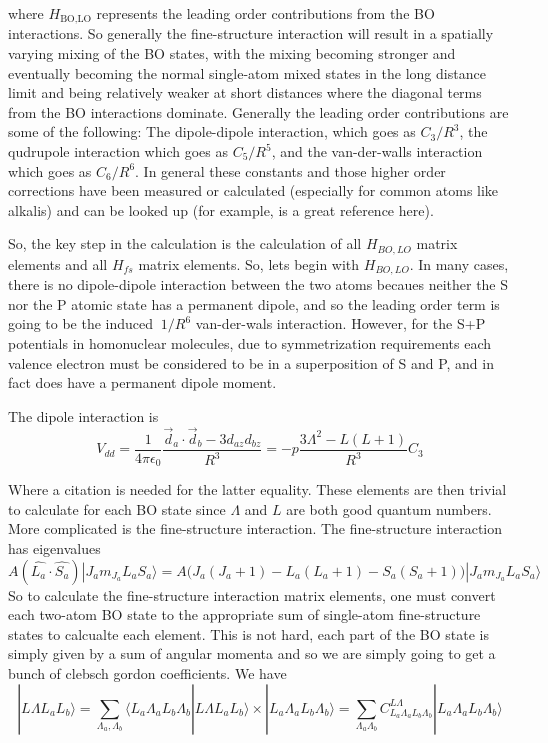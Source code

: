 \documentclass[prl, longbibliography]{revtex4-2}
\begin{document}
where $H_{\text{BO,LO}}$ represents the leading order contributions from the BO interactions. 
So generally the fine-structure interaction will result in a spatially varying mixing of the BO states, with the mixing becoming stronger and eventually becoming the normal single-atom mixed states in the long distance limit and being relatively weaker at short distances where the diagonal terms from the BO interactions dominate.
Generally the leading order contributions are some of the following: The dipole-dipole interaction, which goes as $C_3/R^3$, the qudrupole interaction which goes as $C_5/R^5$, and the van-der-walls interaction which goes as $C_6/R^6$. 
In general these constants and those higher order corrections have been measured or calculated (especially for common atoms like alkalis) and can be looked up (for example, \cite{marinescu_dispersion_1995} is a great reference here).

So, the key step in the calculation is the calculation of all $H_{BO,LO}$ matrix elements and all $H_{fs}$ matrix elements. So, lets begin with $H_{BO,LO}$. In many cases, there is no dipole-dipole interaction between the two atoms becaues neither the S nor the P atomic state has a permanent dipole, and so the leading order term is going to be the induced $~1/R^6$ van-der-wals interaction. However, for the S+P potentials in homonuclear molecules, due to symmetrization requirements each valence electron must be considered to be in a superposition of S and P, and in fact does have a permanent dipole moment. 

The dipole interaction is
\begin{equation}
V_{dd} = \frac{1}{4\pi\epsilon_0}\frac{\vec{d}_a\cdot\vec{d}_b - 3d_{az}d_{bz}}{R^3}=-p\frac{3\Lambda^2-L(L+1)}{R^3} C_3
\end{equation}

Where a citation is needed for the latter equality. These elements are then trivial to calculate for each BO state since $\Lambda$ and $L$ are both good quantum numbers. More complicated is the fine-structure interaction. The fine-structure interaction has eigenvalues
\begin{equation}
A(\hat{L_a}\cdot\hat{S_a})|J_a m_{J_a} L_a S_a\rangle = A\Big(J_a(J_a+1)-L_a(L_a+1)-S_a(S_a+1)\Big)|J_a m_{J_a} L_a S_a\rangle
\end{equation}
So to calculate the fine-structure interaction matrix elements, one must convert each two-atom BO state to the appropriate sum of single-atom fine-structure states to calcualte each element. This is not hard, each part of the BO state is simply given by a sum of angular momenta and so we are simply going to get a bunch of clebsch gordon coefficients. We have 
\begin{equation}
|L\Lambda L_a L_b\rangle=\sum_{\Lambda_a, \Lambda_b}\langle L_a \Lambda_a L_b \Lambda_b|L\Lambda L_a L_b\rangle\times|L_a \Lambda_a L_b \Lambda_b\rangle =\sum_{\Lambda_a \Lambda_b} C_{L_a \Lambda_a L_b \Lambda_b}^{L \Lambda} |L_a \Lambda_a L_b \Lambda_b\rangle
\end{equation}
\end{document}
